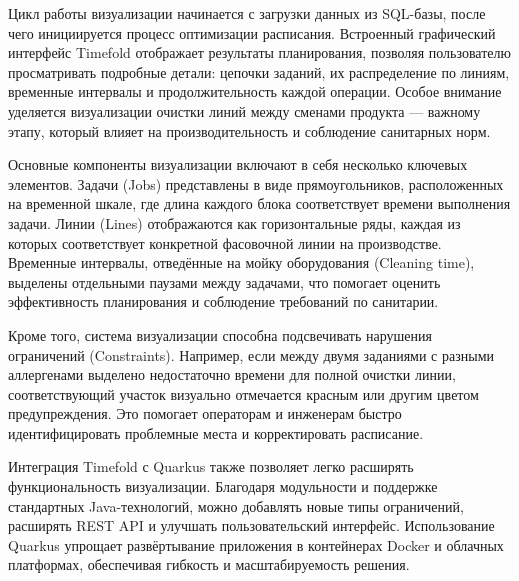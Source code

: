 Цикл работы визуализации начинается с загрузки данных из SQL-базы, после чего инициируется процесс оптимизации расписания. Встроенный графический интерфейс Timefold отображает результаты планирования, позволяя пользователю просматривать подробные детали: цепочки заданий, их распределение по линиям, временные интервалы и продолжительность каждой операции. Особое внимание уделяется визуализации очистки линий между сменами продукта — важному этапу, который влияет на производительность и соблюдение санитарных норм.

Основные компоненты визуализации включают в себя несколько ключевых элементов. Задачи (Jobs) представлены в виде прямоугольников, расположенных на временной шкале, где длина каждого блока соответствует времени выполнения задачи. Линии (Lines) отображаются как горизонтальные ряды, каждая из которых соответствует конкретной фасовочной линии на производстве. Временные интервалы, отведённые на мойку оборудования (Cleaning time), выделены отдельными паузами между задачами, что помогает оценить эффективность планирования и соблюдение требований по санитарии.

Кроме того, система визуализации способна подсвечивать нарушения ограничений (Constraints). Например, если между двумя заданиями с разными аллергенами выделено недостаточно времени для полной очистки линии, соответствующий участок визуально отмечается красным или другим цветом предупреждения. Это помогает операторам и инженерам быстро идентифицировать проблемные места и корректировать расписание.

Интеграция Timefold с Quarkus также позволяет легко расширять функциональность визуализации. Благодаря модульности и поддержке стандартных Java-технологий, можно добавлять новые типы ограничений, расширять REST API и улучшать пользовательский интерфейс. Использование Quarkus упрощает развёртывание приложения в контейнерах Docker и облачных платформах, обеспечивая гибкость и масштабируемость решения.

